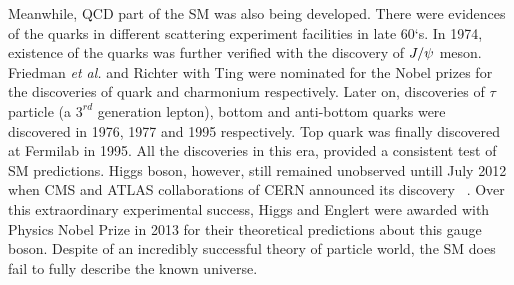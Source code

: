 \par 
Meanwhile, QCD part of the SM was also being developed. There were evidences of the quarks in different scattering experiment facilities in late 60`s. 
In 1974, existence of the quarks was further verified with the discovery of $J/\psi$ meson. Friedman \textit{et al.} and Richter with Ting were nominated for the Nobel prizes for the discoveries of quark and charmonium respectively.
Later on, discoveries of $\tau$ particle (a $3^{rd}$ generation lepton),  bottom and anti-bottom quarks were discovered in 1976, 1977 and 1995 respectively. Top quark was finally discovered at Fermilab in 1995.
All the discoveries in this era, provided a consistent test of SM predictions. Higgs boson, however, still remained unobserved untill July 2012 when CMS and ATLAS collaborations of CERN announced its discovery ~\cite{Reference20,Reference21}. Over this extraordinary experimental success, Higgs and Englert were awarded with Physics Nobel Prize in 2013 for their theoretical predictions about this gauge boson.%
%
Despite of an incredibly successful theory of particle world, the SM does fail to fully describe the known universe.

